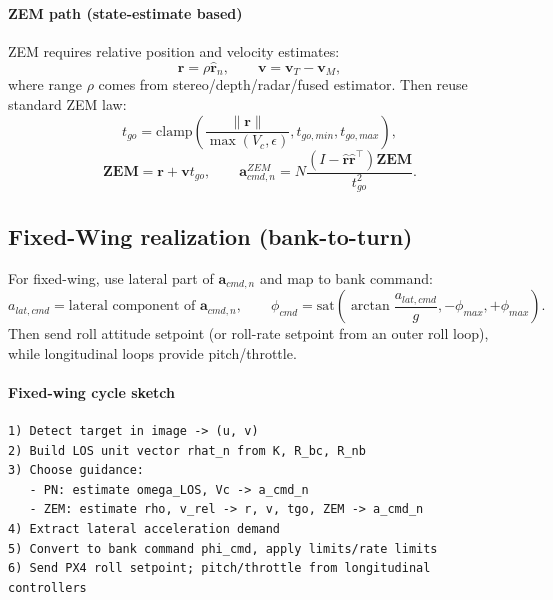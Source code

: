 \documentclass[11pt,a4paper]{article}
\begin{document}
\paragraph{ZEM path (state-estimate based)}
ZEM requires relative position and velocity estimates:
\begin{equation}
\mathbf{r} = \rho\hat{\mathbf{r}}_n,
\qquad
\mathbf{v}=\mathbf{v}_T-\mathbf{v}_M,
\end{equation}
where range $\rho$ comes from stereo/depth/radar/fused estimator. Then reuse standard ZEM law:
\begin{equation}
t_{go}=\mathrm{clamp}\!\left(\frac{\|\mathbf{r}\|}{\max(V_c,\epsilon)},t_{go,min},t_{go,max}\right),
\end{equation}
\begin{equation}
\mathbf{ZEM}=\mathbf{r}+\mathbf{v}t_{go},
\qquad
\mathbf{a}_{cmd,n}^{ZEM}=N\frac{(I-\hat{\mathbf{r}}\hat{\mathbf{r}}^\top)\mathbf{ZEM}}{t_{go}^2}.
\end{equation}

\subsection{Fixed-Wing realization (bank-to-turn)}
For fixed-wing, use lateral part of $\mathbf{a}_{cmd,n}$ and map to bank command:
\begin{equation}
a_{lat,cmd} = \text{lateral component of }\mathbf{a}_{cmd,n},
\qquad
\phi_{cmd}=\mathrm{sat}\!\left(\arctan\frac{a_{lat,cmd}}{g},-\phi_{max},+\phi_{max}\right).
\end{equation}
Then send roll attitude setpoint (or roll-rate setpoint from an outer roll loop), while longitudinal loops provide pitch/throttle.

\paragraph{Fixed-wing cycle sketch}
\begin{verbatim}
1) Detect target in image -> (u, v)
2) Build LOS unit vector rhat_n from K, R_bc, R_nb
3) Choose guidance:
   - PN: estimate omega_LOS, Vc -> a_cmd_n
   - ZEM: estimate rho, v_rel -> r, v, tgo, ZEM -> a_cmd_n
4) Extract lateral acceleration demand
5) Convert to bank command phi_cmd, apply limits/rate limits
6) Send PX4 roll setpoint; pitch/throttle from longitudinal controllers
\end{verbatim}
\end{document}
